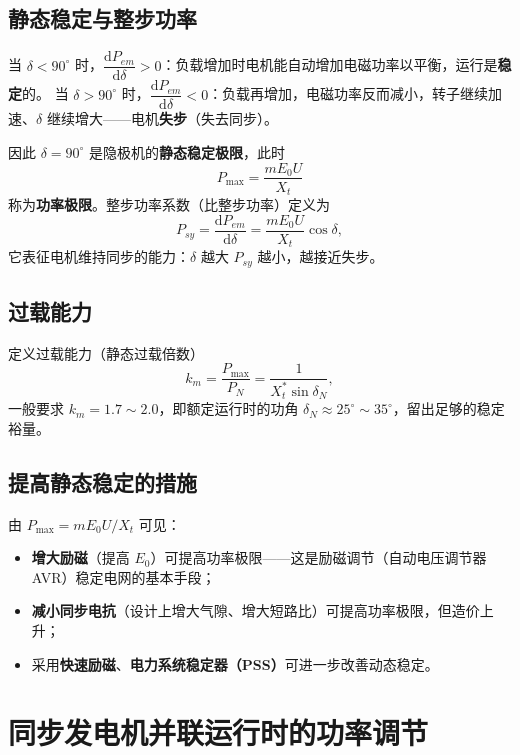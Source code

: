 \subsection{静态稳定与整步功率}
当 $\delta<90^\circ$ 时，$\dfrac{\mathrm{d}P_{em}}{\mathrm{d}\delta}>0$：负载增加时电机能自动增加电磁功率以平衡，运行是\textbf{稳定}的。
当 $\delta>90^\circ$ 时，$\dfrac{\mathrm{d}P_{em}}{\mathrm{d}\delta}<0$：负载再增加，电磁功率反而减小，转子继续加速、$\delta$ 继续增大——电机\textbf{失步}（失去同步）。

因此 $\delta=90^\circ$ 是隐极机的\textbf{静态稳定极限}，此时
\begin{equation}
P_{\max}=\frac{mE_0U}{X_t}
\end{equation}
称为\textbf{功率极限}。整步功率系数（比整步功率）定义为
\begin{equation}
P_{sy}=\frac{\mathrm{d}P_{em}}{\mathrm{d}\delta}=\frac{mE_0U}{X_t}\cos\delta ,
\end{equation}
它表征电机维持同步的能力：$\delta$ 越大 $P_{sy}$ 越小，越接近失步。


\subsection{过载能力}
定义过载能力（静态过载倍数）
\begin{equation}
k_m=\frac{P_{\max}}{P_N}=\frac{1}{X_t^{*}\sin\delta_N},
\end{equation}
一般要求 $k_m=1.7\sim2.0$，即额定运行时的功角 $\delta_N\approx25^\circ\sim35^\circ$，留出足够的稳定裕量。

\subsection{提高静态稳定的措施}
由 $P_{\max}=mE_0U/X_t$ 可见：
\begin{itemize}
  \item \textbf{增大励磁}（提高 $E_0$）可提高功率极限——这是励磁调节（自动电压调节器 AVR）稳定电网的基本手段；
  \item \textbf{减小同步电抗}（设计上增大气隙、增大短路比）可提高功率极限，但造价上升；
  \item 采用\textbf{快速励磁}、\textbf{电力系统稳定器（PSS）}可进一步改善动态稳定。
\end{itemize}

\section{同步发电机并联运行时的功率调节}

